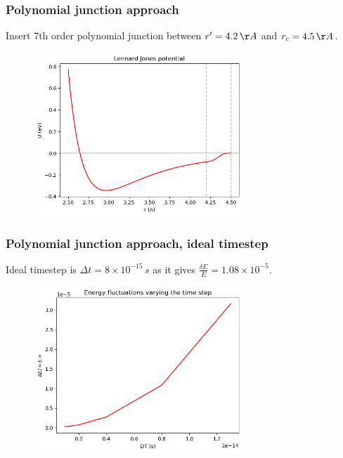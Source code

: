 \documentclass{beamer}
\begin{document}
\begin{frame}
    \frametitle{Polynomial junction approach}

    Insert 7th order polynomial junction between $r'=4.2\,\AA$ and $r_c=4.5\,\AA$.
    \begin{figure}
        \includegraphics[width=0.7\textwidth]{images/LJ.png}
    \end{figure}

\end{frame}

\begin{frame}
    \frametitle{Polynomial junction approach, ideal timestep}

    Ideal timestep is $\Delta t = 8\times 10^{-15}\,s$ as it gives $\frac{\delta E}{E}= 1.08 \times 10^{-5}$.
    \begin{figure}
        \includegraphics[width=0.7\textwidth]{images/lowertimestepamazing.png}
    \end{figure}

\end{frame}
\end{document}
